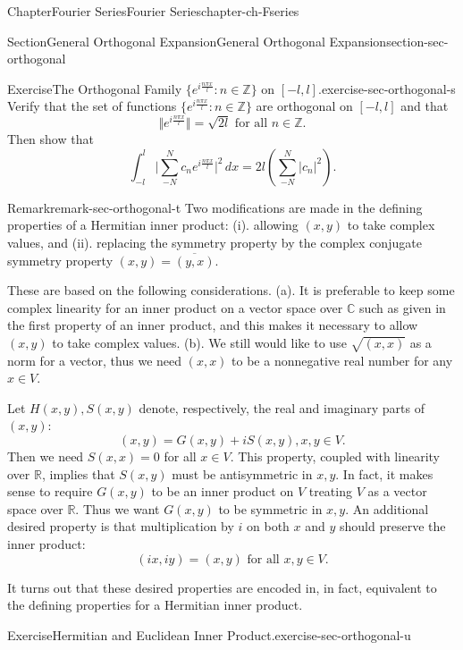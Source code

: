 \documentclass[oneside,10pt,]{book}
\numberwithin{equation}{section}
\newcommand{\bbC}{\mathbb{C}}
\newcommand{\bbR}{\mathbb{R}}
\newcommand{\bbZ}{\mathbb{Z}}
\begin{document}
\begin{chapterptx}{Chapter}{Fourier Series}{}{Fourier Series}{}{}{chapter-ch-Fseries}
\begin{sectionptx}{Section}{General Orthogonal Expansion}{}{General Orthogonal Expansion}{}{}{section-sec-orthogonal}
\begin{inlineexercise}{Exercise}{The Orthogonal Family \(\{ e^{i\frac{n\pi x}{l}}: n\in \bbZ\}\) on \([-l, l]\).}{exercise-sec-orthogonal-s}
Verify that the set of functions \(\{ e^{i\frac{n\pi x}{l}}: n\in \bbZ\}\) are orthogonal on \([-l, l]\) and that%
\begin{equation*}
\Vert e^{i\frac{n\pi x}{l}} \Vert= \sqrt{2l} \text{ for all $n\in \bbZ$.}
\end{equation*}
Then show that%
\begin{equation*}
\int_{-l}^{l}  \vert \sum_{-N}^{N}c_{n} e^{i\frac{n\pi x}{l}}\vert^{2}\, dx
= 2l\left( \sum_{-N}^{N} |c_{n}|^{2}\right).
\end{equation*}
\end{inlineexercise}%
\begin{remark}{Remark}{}{remark-sec-orthogonal-t}%
Two modifications are made in  the defining properties of a Hermitian inner product: (i). allowing \((x, y)\) to take complex values, and (ii). replacing the symmetry property by the complex conjugate symmetry property \((x, y)=\overline{(y, x)}\).%
\par
These are based on the following considerations. (a). It is preferable to keep some complex linearity for an inner product on a vector space over \(\bbC\) such as given in the first property of an inner product, and this makes it necessary to allow \((x, y)\) to take complex values. (b). We still would like to use \(\sqrt{(x, x)}\) as a norm for a vector, thus we need \((x, x) \) to be a nonnegative real number for any \(x\in V\).%
\par
Let \(H(x, y), S(x, y)\) denote, respectively, the real and imaginary parts of \((x, y)\):%
\begin{equation*}
(x, y) =G(x, y)+ i S(x, y), x, y \in V.
\end{equation*}
Then we need \(S(x, x)=0\) for all \(x\in V\). This property, coupled with linearity over \(\bbR\), implies that \(S(x, y)\) must be antisymmetric in \(x, y\).  In fact, it makes sense to require \(G(x, y)\) to be an inner product on \(V\) treating \(V\) as a vector space over \(\bbR\). Thus we want \(G(x, y)\) to be symmetric in \(x, y\).  An additional desired property is that multiplication by \(i\) on both \(x\) and \(y\) should preserve the inner product:%
\begin{equation*}
(ix, iy)=(x, y) \text{ for all $x, y\in V$.}
\end{equation*}
%
\par
It turns out that these desired properties are encoded in, in fact, equivalent to the defining properties for a Hermitian inner product.%
\end{remark}
\begin{inlineexercise}{Exercise}{Hermitian and Euclidean Inner Product.}{exercise-sec-orthogonal-u}%

\end{inlineexercise}
\end{sectionptx}
\end{chapterptx}
\end{document}
